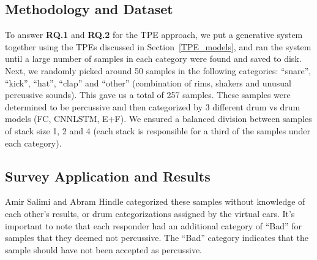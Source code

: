 \documentclass[\main/thesis.tex]{subfiles}
\begin{document}
 
 \subsection{Methodology and Dataset}
  To answer \textbf{RQ.1} and \textbf{RQ.2} for the TPE approach, we put a generative system together using the TPEs discussed in Section~\ref{TPE_models}, and ran the system until a large number of samples in each category were found and saved to disk. Next, we randomly picked around 50 samples in the following categories: \enquote{snare}, \enquote{kick}, \enquote{hat}, \enquote{clap} and \enquote{other} (combination of rims, 
shakers and unusual percussive sounds). This gave us a total of 257 samples. These samples were determined to be percussive and then categorized by 3 different drum vs drum models (FC, CNNLSTM, E+F). We ensured a balanced division between samples of stack size 1, 2 and 4 (each stack is responsible for a third of the samples under each category).
 \subsection{Survey Application and Results}
Amir Salimi and Abram Hindle categorized these samples without knowledge of each other's results, or drum categorizations assigned by the virtual ears. It's important to note that each responder had an additional category of \enquote{Bad} for samples that they deemed not percussive. The \enquote{Bad} category indicates that the sample should have not been accepted as percussive.
\end{document}
